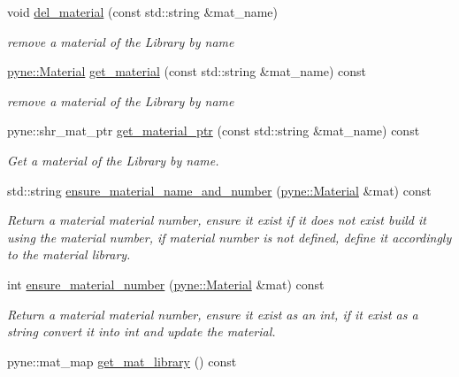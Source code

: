\begin{DoxyCompactItemize}
void \hyperlink{classpyne_1_1_material_library_a2b433e4d9c8d5c7cfeed915cd83f843c}{del\+\_\+material} (const std\+::string \&mat\+\_\+name)
\begin{DoxyCompactList}\small\item\em remove a material of the Library by name \end{DoxyCompactList}\item 
\hyperlink{classpyne_1_1_material}{pyne\+::\+Material} \hyperlink{classpyne_1_1_material_library_a7f4a9f6b1122433bd2191cb54fc27e30}{get\+\_\+material} (const std\+::string \&mat\+\_\+name) const
\begin{DoxyCompactList}\small\item\em remove a material of the Library by name \end{DoxyCompactList}\item 
pyne\+::shr\+\_\+mat\+\_\+ptr \hyperlink{classpyne_1_1_material_library_a4d14394a369b4cecb07a5e875f7713d1}{get\+\_\+material\+\_\+ptr} (const std\+::string \&mat\+\_\+name) const
\begin{DoxyCompactList}\small\item\em Get a material of the Library by name. \end{DoxyCompactList}\item 
std\+::string \hyperlink{classpyne_1_1_material_library_a6e416ec04f0ba8e61889741ff20deac8}{ensure\+\_\+material\+\_\+name\+\_\+and\+\_\+number} (\hyperlink{classpyne_1_1_material}{pyne\+::\+Material} \&mat) const
\begin{DoxyCompactList}\small\item\em Return a material material number, ensure it exist if it does not exist build it using the material number, if material number is not defined, define it accordingly to the material library. \end{DoxyCompactList}\item 
int \hyperlink{classpyne_1_1_material_library_a9fd496f65788d0fb140ebdd59163aa34}{ensure\+\_\+material\+\_\+number} (\hyperlink{classpyne_1_1_material}{pyne\+::\+Material} \&mat) const
\begin{DoxyCompactList}\small\item\em Return a material material number, ensure it exist as an int, if it exist as a string convert it into int and update the material. \end{DoxyCompactList}\item 
pyne\+::mat\+\_\+map \hyperlink{classpyne_1_1_material_library_aac74b654cf331fada9b8030098c9f3ea}{get\+\_\+mat\+\_\+library} () const

\end{DoxyCompactItemize}
